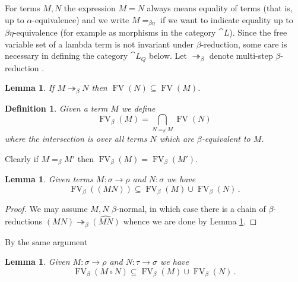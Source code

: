 \documentclass[english,letter paper,12pt,leqno]{article}
\newtheorem{lemma}[theorem]{Lemma}
\theoremstyle{example}
\newtheorem{definition}[theorem]{Definition}
\numberwithin{equation}{section}
\def\be{\begin{equation}}
\def\ee{\end{equation}}
\def\ldot{\,.\,}
\def\FV{\operatorname{FV}}
\def\typearrow{\rightarrow}
\begin{document}
For terms $M,N$ the expression $M = N$ always means equality of terms (that is, up to $\alpha$-equivalence) and we write $M =_{\beta\eta}$ if we want to indicate equality up to $\beta\eta$-equivalence (for example as morphisms in the category $\cat{L}$). Since the free variable set of a lambda term is not invariant under $\beta$-reduction, some care is necessary in defining the category $\cat{L}_Q$ below. Let $\twoheadrightarrow_\beta$ denote multi-step $\beta$-reduction \cite[Definition 1.3.3]{sorensen}.

\begin{lemma}\label{lemma:beta_reduce_FV} If $M \twoheadrightarrow_\beta N$ then $\FV(N) \subseteq \FV(M)$.
\end{lemma}

\begin{definition} Given a term $M$ we define
\[
\FV_\beta(M) = \bigcap_{N =_{\beta} M} \FV(N)
\]
where the intersection is over all terms $N$ which are $\beta$-equivalent to $M$. 
\end{definition}

Clearly if $M =_{\beta} M'$ then $\FV_\beta(M) = \FV_\beta(M')$.

\begin{lemma} Given terms $M: \sigma \typearrow \rho$ and $N : \sigma$ we have
\[
\FV_\beta( (M N) ) \subseteq \FV_\beta(M) \cup \FV_\beta(N)\,.
\]
\end{lemma}
\begin{proof}
We may assume $M,N$ $\beta$-normal, in which case there is a chain of $\beta$-reductions $(M N) \twoheadrightarrow_\beta \widehat{(M N)}$ whence we are done by Lemma \ref{lemma:beta_reduce_FV}.
\end{proof}


By the same argument

\begin{lemma}\label{lemma:comp} Given $M: \sigma \typearrow \rho$ and $N: \tau \typearrow \sigma$ we have
\be\label{eq:weak_func}
\FV_\beta( M \circ N ) \subseteq \FV_\beta(M) \cup \FV_\beta(N)\,.
\ee
\end{lemma}
\end{document}
